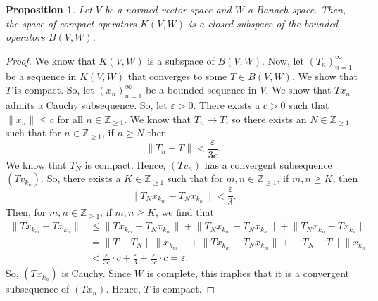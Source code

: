 \documentclass[a4paper, openany]{memoir}
\theoremstyle{definition}
\theoremstyle{plain}
\newtheorem{proposition}[definition]{Proposition}
\begin{document}
    \begin{proposition}
        Let $V$ be a normed vector space and $W$ a Banach space. Then, the space of compact operators $K(V, W)$ is a closed subspace of the bounded operators $B(V, W)$.
    \end{proposition}
    \begin{proof}
        We know that $K(V, W)$ is a subspace of $B(V, W)$. Now, let $(T_n)_{n=1}^\infty$ be a sequence in $K(V, W)$ that converges to some $T \in B(V, W)$. We show that $T$ is compact. So, let $(x_n)_{n=1}^\infty$ be a bounded sequence in $V$. We show that $Tx_n$ admits a Cauchy subsequence. So, let $\varepsilon > 0$. There exists a $c > 0$ such that $\lVert x_n \rVert \leq c$ for all $n \in \mathbb{Z}_{\geq 1}$. We know that $T_n \to T$, so there exists an $N \in \mathbb{Z}_{\geq 1}$ such that for $n \in \mathbb{Z}_{\geq 1}$, if $n \geq N$ then 
        \[\lVert T_n - T \rVert < \frac{\varepsilon}{3c}.\]
        We know that $T_N$ is compact. Hence, $(Tv_n)$ has a convergent subsequence $(Tv_{k_n})$. So, there exists a $K \in \mathbb{Z}_{\geq 1}$ such that for $m, n \in \mathbb{Z}_{\geq 1}$, if $m, n \geq K$, then 
        \[\lVert T_N x_{k_m} - T_N x_{k_n} \rVert < \frac{\varepsilon}{3}.\]
        Then, for $m, n \in \mathbb{Z}_{\geq 1}$, if $m, n \geq K$, we find that
        \begin{align*}
            \lVert Tx_{k_m} - Tx_{k_n} \rVert &\leq \lVert T x_{k_m} - T_N x_{k_m} \rVert + \lVert T_N x_{k_m} - T_N x_{k_n} \rVert + \lVert T_N x_{k_n} - T x_{k_n} \rVert \\
            &= \lVert T - T_N \rVert \lVert x_{k_m} \rVert + \lVert T x_{k_m} - T_N x_{k_m} \rVert + \lVert T_N- T \rVert \lVert  x_{k_n} \rVert \\
            &< \frac{\varepsilon}{3c} \cdot c + \frac{\varepsilon}{3} + \frac{\varepsilon}{3c} \cdot c = \varepsilon.
        \end{align*}
        So, $(Tx_{k_n})$ is Cauchy. Since $W$ is complete, this implies that it is a convergent subsequence of $(Tx_n)$. Hence, $T$ is compact.
    \end{proof}
\end{document}
